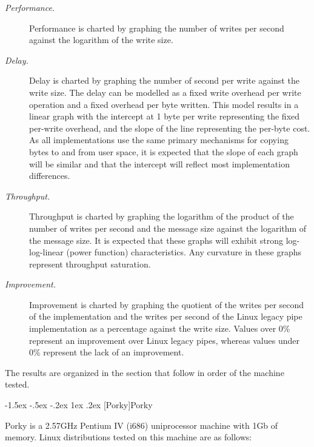 \documentclass[letterpaper,final,notitlepage,twocolumn,10pt,twoside]{article}
\makeatletter
\renewcommand\subsection{\@startsection{subsection}{2}{\z@}%
                                     {-1.5ex \@plus -.5ex \@minus -.2ex}%
                                     {1ex \@plus .2ex}%
                                     {\normalfont\normalsize\bfseries}}
\makeatother
\begin{document}
\begin{description}

\item[{\it Performance.}]

Performance is charted by graphing the number of writes per second against the
logarithm of the write size.

\item[{\it Delay.}]

Delay is charted by graphing the number of second per write against the write
size.  The delay can be modelled as a fixed write overhead per write operation
and a fixed overhead per byte written.  This model results in a linear graph
with the intercept at 1 byte per write representing the fixed per-write
overhead, and the slope of the line representing the per-byte cost.  As all
implementations use the same primary mechanisms for copying bytes to and from
user space, it is expected that the slope of each graph will be similar and
that the intercept will reflect most implementation differences.

\item[{\it Throughput.}]

Throughput is charted by graphing the logarithm of the product of the number
of writes per second and the message size against the logarithm of the message
size.  It is expected that these graphs will exhibit strong log-log-linear
(power function) characteristics.  Any curvature in these graphs represent
throughput saturation.

\item[{\it Improvement.}]

Improvement is charted by graphing the quotient of the writes per second of
the implementation and the writes per second of the Linux legacy pipe
implementation as a percentage against the write size.  Values over 0\%
represent an improvement over Linux legacy pipes, whereas values under 0\%
represent the lack of an improvement.

\end{description}

The results are organized in the section that follow in order of the machine
tested.

\subsection[Porky]{Porky}

Porky is a 2.57GHz Pentium IV (i686) uniprocessor machine with 1Gb of memory.
Linux distributions tested on this machine are as follows:
\end{document}
